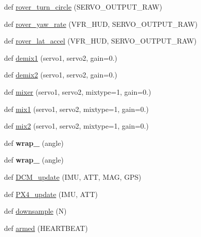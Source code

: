 \begin{DoxyCompactItemize}
\item 
def \hyperlink{namespacepymavlink_1_1mavextra_a2cf4432c48b582f8471874e3ae33de17}{rover\+\_\+turn\+\_\+circle} (S\+E\+R\+V\+O\+\_\+\+O\+U\+T\+P\+U\+T\+\_\+\+R\+AW)
\item 
def \hyperlink{namespacepymavlink_1_1mavextra_a06610d38e6694c31c2fdbaafd57eae54}{rover\+\_\+yaw\+\_\+rate} (V\+F\+R\+\_\+\+H\+UD, S\+E\+R\+V\+O\+\_\+\+O\+U\+T\+P\+U\+T\+\_\+\+R\+AW)
\item 
def \hyperlink{namespacepymavlink_1_1mavextra_a55bf23fb8b11c2e546dddb4eab80eae0}{rover\+\_\+lat\+\_\+accel} (V\+F\+R\+\_\+\+H\+UD, S\+E\+R\+V\+O\+\_\+\+O\+U\+T\+P\+U\+T\+\_\+\+R\+AW)
\item 
def \hyperlink{namespacepymavlink_1_1mavextra_adf962a14bd3df2e4c752b3ac3c016674}{demix1} (servo1, servo2, gain=0.)
\item 
def \hyperlink{namespacepymavlink_1_1mavextra_acb35268957b8dd904a70309763ab2c95}{demix2} (servo1, servo2, gain=0.)
\item 
def \hyperlink{namespacepymavlink_1_1mavextra_ae33f40df072016fd86d881d715a57f91}{mixer} (servo1, servo2, mixtype=1, gain=0.)
\item 
def \hyperlink{namespacepymavlink_1_1mavextra_ae2ac3b544989ec220c6ef351e7ef5204}{mix1} (servo1, servo2, mixtype=1, gain=0.)
\item 
def \hyperlink{namespacepymavlink_1_1mavextra_a9917a9cc993bdb7a607478dbb089111d}{mix2} (servo1, servo2, mixtype=1, gain=0.)
\item 
\mbox{\label{namespacepymavlink_1_1mavextra_a85414a40febdc276343f85e8ee63d3b4}} 
def {\bfseries wrap\+\_} (angle)
\item 
\mbox{\label{namespacepymavlink_1_1mavextra_ace15c40f51a7caffd4a6364bb0afea52}} 
def {\bfseries wrap\+\_} (angle)
\item 
def \hyperlink{namespacepymavlink_1_1mavextra_a602868624e22e520d6376334c46aed97}{D\+C\+M\+\_\+update} (I\+MU, A\+TT, M\+AG, G\+PS)
\item 
def \hyperlink{namespacepymavlink_1_1mavextra_a80093b7c26c5a448b247049fa10a203d}{P\+X4\+\_\+update} (I\+MU, A\+TT)
\item 
def \hyperlink{namespacepymavlink_1_1mavextra_a6430a3ecdcd4b86e25851749bb4069b0}{downsample} (N)
\item 
def \hyperlink{namespacepymavlink_1_1mavextra_a00f2c88d67afcae53f725e0d8105adb1}{armed} (H\+E\+A\+R\+T\+B\+E\+AT)

\end{DoxyCompactItemize}
